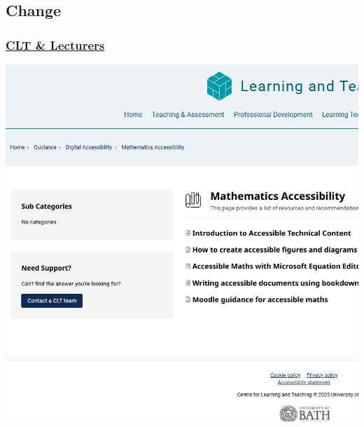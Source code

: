 \documentclass[
  letterpaper,
  DIV=11,
  numbers=noendperiod]{scrartcl}
\begin{document}
\subsection{Change}\label{change}

\subsubsection{\texorpdfstring{\href{https://teachinghub.bath.ac.uk/guide-category/technical-accessibility/}{CLT
\& Lecturers}}{CLT \& Lecturers}}\label{clt-lecturers}

\includegraphics{./images/CLT.png}\\
\end{document}
